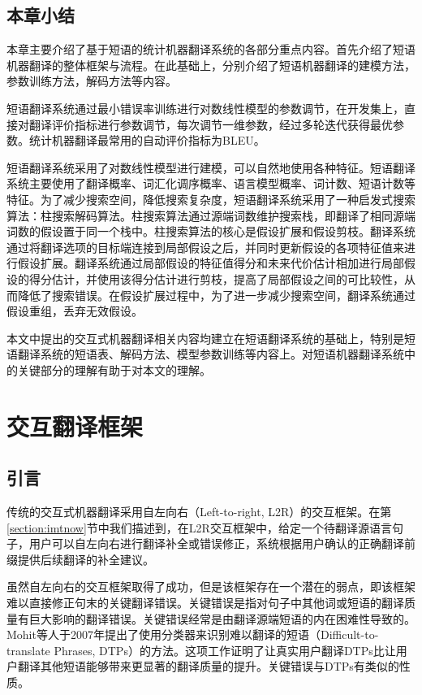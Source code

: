 \documentclass[master, winfont]{njuthesis}
\begin{document}
\section{本章小结}
本章主要介绍了基于短语的统计机器翻译系统的各部分重点内容。首先介绍了短语机器翻译的整体框架与流程。在此基础上，分别介绍了短语机器翻译的建模方法，参数训练方法，解码方法等内容。

短语翻译系统通过最小错误率训练进行对数线性模型的参数调节，在开发集上，直接对翻译评价指标进行参数调节，每次调节一维参数，经过多轮迭代获得最优参数。统计机器翻译最常用的自动评价指标为BLEU。

短语翻译系统采用了对数线性模型进行建模，可以自然地使用各种特征。短语翻译系统主要使用了翻译概率、词汇化调序概率、语言模型概率、词计数、短语计数等特征。为了减少搜索空间，降低搜索复杂度，短语翻译系统采用了一种启发式搜索算法：柱搜索解码算法。柱搜索算法通过源端词数维护搜索栈，即翻译了相同源端词数的假设置于同一个栈中。柱搜索算法的核心是假设扩展和假设剪枝。翻译系统通过将翻译选项的目标端连接到局部假设之后，并同时更新假设的各项特征值来进行假设扩展。翻译系统通过局部假设的特征值得分和未来代价估计相加进行局部假设的得分估计，并使用该得分估计进行剪枝，提高了局部假设之间的可比较性，从而降低了搜索错误。在假设扩展过程中，为了进一步减少搜索空间，翻译系统通过假设重组，丢弃无效假设。

本文中提出的交互式机器翻译相关内容均建立在短语翻译系统的基础上，特别是短语翻译系统的短语表、解码方法、模型参数训练等内容上。对短语机器翻译系统中的关键部分的理解有助于对本文的理解。

\chapter{交互翻译框架}
\label{chapter:primt}
\section{引言}
传统的交互式机器翻译采用自左向右（Left-to-right, L2R）的交互框架。在第\ref{section:imtnow}节中我们描述到，在L2R交互框架中，给定一个待翻译源语言句子，用户可以自左向右进行翻译补全或错误修正，系统根据用户确认的正确翻译前缀提供后续翻译的补全建议。

虽然自左向右的交互框架取得了成功，但是该框架存在一个潜在的弱点，即该框架难以直接修正句末的关键翻译错误。关键错误是指对句子中其他词或短语的翻译质量有巨大影响的翻译错误。关键错误经常是由翻译源端短语的内在困难性导致的。Mohit等人\cite{mohit2007localization}于2007年提出了使用分类器来识别难以翻译的短语（Difficult-to-translate Phrases, DTPs）的方法。这项工作证明了让真实用户翻译DTPs比让用户翻译其他短语能够带来更显著的翻译质量的提升。关键错误与DTPs有类似的性质。
\end{document}
